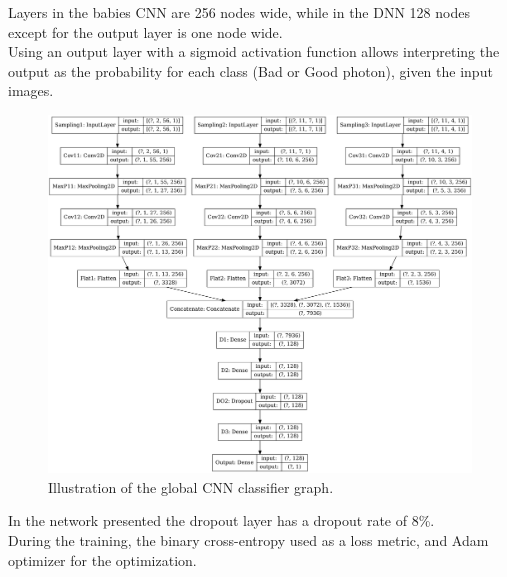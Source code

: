 Layers in the babies CNN are 256 nodes wide, while in the DNN 128 nodes except for the output layer is one node wide.\\
Using an output layer with a sigmoid activation function allows interpreting the output as the probability for each class (Bad or Good photon), given the input images.\\
\begin{figure}[H]
    \centering
    \includegraphics[width=1.\textwidth]{Ch3/Img/CNN_model.png}
    \caption{Illustration of the global CNN classifier graph.}
    \label{fig:gamma:CNN:Model:Arch}
\end{figure}
In the network presented the dropout layer has a dropout rate of 8\%.\\
During the training, the binary cross-entropy used as a loss metric, and Adam optimizer for the optimization.
